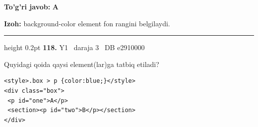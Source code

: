 \documentclass[10pt,a4paper,oneside]{article}
\begin{document}
\begin{tcolorbox}[enhanced,breakable,colback=teal!4,colframe=teal!45!black,boxrule=0.45pt,arc=1.2mm,left=2.8mm,right=2.8mm,top=2mm,bottom=2mm,before skip=2mm,after skip=2mm]
\textbf{\color{teal}To'g'ri javob:} \textbf{A}
\par\smallskip
\textbf{Izoh:} background-color element fon rangini belgilaydi.
\end{tcolorbox}
\vspace{2mm}\hrule height 0.2pt \vspace{4mm}
\hypertarget{q118}{\textbf{\color{ink}118.}}  {\color{muted}\scriptsize Y1 \textbullet\ daraja 3 \textbullet\ DB e2910000}
\par
Quyidagi qoida qaysi element(lar)ga tatbiq etiladi?\par
\begin{lstlisting}
<style>.box > p {color:blue;}</style>
<div class="box">
 <p id="one">A</p>
 <section><p id="two">B</p></section>
</div>
\end{lstlisting}
\end{document}
